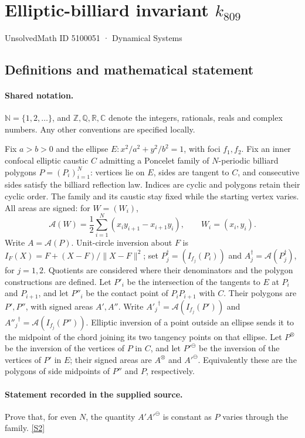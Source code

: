 \documentclass[11pt]{article}
\newcommand{\sref}[2]{\hyperlink{source:#1:#2}{[S#2]}}
\begin{document}
\setcounter{section}{5100050}
\section{Elliptic-billiard invariant $k_{809}$}\label{5100051}
{\small\sffamily UnsolvedMath ID 5100051 · Dynamical Systems}
\subsection{Definitions and mathematical statement}

\paragraph{Shared notation.}$\mathbb N=\{1,2,\ldots\}$, and $\mathbb Z,\mathbb Q,\mathbb R,\mathbb C$ denote the integers, rationals, reals and complex numbers. Any other conventions are specified locally.


Fix $a>b>0$ and the ellipse $E:x^2/a^2+y^2/b^2=1$, with foci $f_1,f_2$. Fix an inner confocal elliptic caustic $C$ admitting a Poncelet family of $N$-periodic billiard polygons $P=(P_i)_{i=1}^N$: vertices lie on $E$, sides are tangent to $C$, and consecutive sides satisfy the billiard reflection law. Indices are cyclic and polygons retain their cyclic order. The family and its caustic stay fixed while the starting vertex varies. All areas are signed: for $W=(W_i)$,
\[\mathcal A(W)=\frac12\sum_{i=1}^N(x_i y_{i+1}-x_{i+1}y_i),\qquad W_i=(x_i,y_i).\]
Write $A=\mathcal A(P)$. Unit-circle inversion about $F$ is $I_F(X)=F+(X-F)/\lVert X-F\rVert^2$; set $P_j^\dagger=(I_{f_j}(P_i))$ and $A_j^\dagger=\mathcal A(P_j^\dagger)$, for $j=1,2$. Quotients are considered where their denominators and the polygon constructions are defined. Let $P'_i$ be the intersection of the tangents to $E$ at $P_i$ and $P_{i+1}$, and let $P''_i$ be the contact point of $P_iP_{i+1}$ with $C$. Their polygons are $P',P''$, with signed areas $A',A''$. Write ${A'_j}^\dagger=\mathcal A(I_{f_j}(P'))$ and ${A''_j}^\dagger=\mathcal A(I_{f_j}(P''))$. Elliptic inversion of a point outside an ellipse sends it to the midpoint of the chord joining its two tangency points on that ellipse. Let $P^\otimes$ be the inversion of the vertices of $P$ in $C$, and let ${P'}^\ominus$ be the inversion of the vertices of $P'$ in $E$; their signed areas are $A^\otimes$ and ${A'}^\ominus$. Equivalently these are the polygons of side midpoints of $P''$ and $P$, respectively.
\paragraph{Statement recorded in the supplied source.}
Prove that, for even $N$, the quantity $A'{A'}^\ominus$ is constant as $P$ varies through the family. \sref{5100051}{2}
\end{document}

